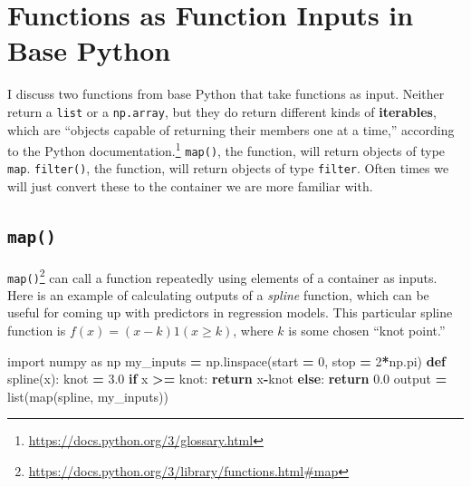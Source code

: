 \documentclass[
  12pt,
  krantz2]{krantz}
\makeatletter
\newenvironment{Shaded}{\begin{snugshade}}{\end{snugshade}}
\newcommand{\BuiltInTok}[1]{#1}
\newcommand{\ControlFlowTok}[1]{\textcolor[rgb]{0.27,0.27,0.27}{\textbf{#1}}}
\newcommand{\DecValTok}[1]{\textcolor[rgb]{0.06,0.06,0.06}{#1}}
\newcommand{\FloatTok}[1]{\textcolor[rgb]{0.06,0.06,0.06}{#1}}
\newcommand{\ImportTok}[1]{#1}
\newcommand{\KeywordTok}[1]{\textcolor[rgb]{0.27,0.27,0.27}{\textbf{#1}}}
\newcommand{\NormalTok}[1]{#1}
\newcommand{\OperatorTok}[1]{\textcolor[rgb]{0.43,0.43,0.43}{\textbf{#1}}}
\renewcommand{\href}[2]{#2\footnote{\url{#1}}}
\newenvironment{kframe}{%
\medskip{}
\setlength{\fboxsep}{.8em}
 \def\at@end@of@kframe{}%
 \ifinner\ifhmode%
  \def\at@end@of@kframe{\end{minipage}}%
  \begin{minipage}{\columnwidth}%
 \fi\fi%
 \def\FrameCommand##1{\hskip\@totalleftmargin \hskip-\fboxsep
 \colorbox{shadecolor}{##1}\hskip-\fboxsep
     \hskip-\linewidth \hskip-\@totalleftmargin \hskip\columnwidth}%
 \MakeFramed {\advance\hsize-\width
   \@totalleftmargin\z@ \linewidth\hsize
   \@setminipage}}%
 {\par\unskip\endMakeFramed%
 \at@end@of@kframe}
\renewenvironment{Shaded}{\begin{kframe}}{\end{kframe}}
\makeatother
\begin{document}
\hypertarget{functions-as-function-inputs-in-base-python}{%
\section{Functions as Function Inputs in Base Python}\label{functions-as-function-inputs-in-base-python}}

I discuss two functions from base Python that take functions as input. Neither return a \texttt{list} or a \texttt{np.array}, but they do return different kinds of \textbf{iterables}, which are ``objects capable of returning their members one at a time,'' \href{https://docs.python.org/3/glossary.html}{according to the Python documentation.} \texttt{map()}, the function, will return objects of type \texttt{map}. \texttt{filter()}, the function, will return objects of type \texttt{filter}. Often times we will just convert these to the container we are more familiar with.

\hypertarget{map}{%
\subsection{\texorpdfstring{\texttt{map()}}{map()}}\label{map}}

\href{https://docs.python.org/3/library/functions.html\#map}{\texttt{map()}} can call a function repeatedly using elements of a container as inputs. Here is an example of calculating outputs of a \emph{spline} function, which can be useful for coming up with predictors in regression models. This particular spline function is \(f(x) = (x-k)1(x \ge k)\), where \(k\) is some chosen ``knot point.''

\begin{Shaded}
\begin{Highlighting}[]
\ImportTok{import}\NormalTok{ numpy }\ImportTok{as}\NormalTok{ np}
\NormalTok{my\_inputs }\OperatorTok{=}\NormalTok{ np.linspace(start }\OperatorTok{=} \DecValTok{0}\NormalTok{, stop }\OperatorTok{=} \DecValTok{2}\OperatorTok{*}\NormalTok{np.pi)}
\KeywordTok{def}\NormalTok{ spline(x):}
\NormalTok{    knot }\OperatorTok{=} \FloatTok{3.0}
    \ControlFlowTok{if}\NormalTok{ x }\OperatorTok{\textgreater{}=}\NormalTok{ knot:}
        \ControlFlowTok{return}\NormalTok{ x}\OperatorTok{{-}}\NormalTok{knot}
    \ControlFlowTok{else}\NormalTok{:}
        \ControlFlowTok{return} \FloatTok{0.0}
\NormalTok{output }\OperatorTok{=} \BuiltInTok{list}\NormalTok{(}\BuiltInTok{map}\NormalTok{(spline, my\_inputs))}
\end{Highlighting}
\end{Shaded}
\end{document}
